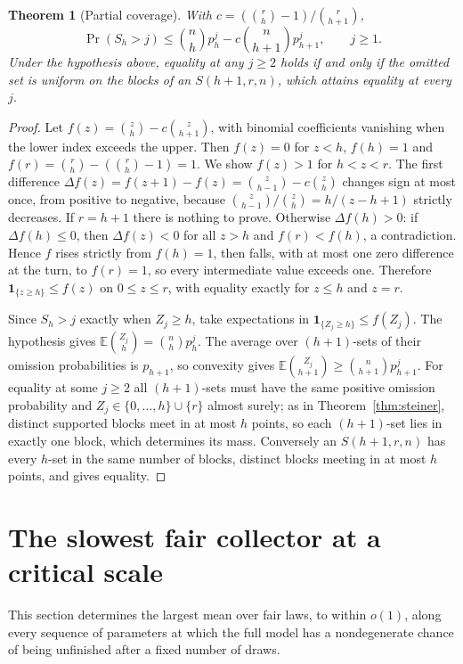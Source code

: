\documentclass[11pt,a4paper]{article}
\newtheorem{theorem}{Theorem}[section]
\theoremstyle{remark}
\newcommand{\E}{\mathbb E}
\newcommand{\ind}{\mathbf 1}
\begin{document}
\begin{theorem}[Partial coverage]\label{thm:higher}
With $c=(\binom rh-1)/\binom r{h+1}$,
\[
 \Pr(S_h>j)\le \binom nh p_h^j-c\binom n{h+1}p_{h+1}^j,\qquad j\ge1 .
\]
Under the hypothesis above, equality at any $j\ge2$ holds if and only if the omitted set is uniform on the blocks of an $S(h+1,r,n)$, which attains equality at every $j$.
\end{theorem}
\begin{proof}
Let $f(z)=\binom zh-c\binom z{h+1}$, with binomial coefficients vanishing when the lower index exceeds the upper. Then $f(z)=0$ for $z<h$, $f(h)=1$ and $f(r)=\binom rh-(\binom rh-1)=1$. We show $f(z)>1$ for $h<z<r$. The first difference $\Delta f(z)=f(z+1)-f(z)=\binom z{h-1}-c\binom zh$ changes sign at most once, from positive to negative, because $\binom z{h-1}/\binom zh=h/(z-h+1)$ strictly decreases. If $r=h+1$ there is nothing to prove. Otherwise $\Delta f(h)>0$: if $\Delta f(h)\le0$, then $\Delta f(z)<0$ for all $z>h$ and $f(r)<f(h)$, a contradiction. Hence $f$ rises strictly from $f(h)=1$, then falls, with at most one zero difference at the turn, to $f(r)=1$, so every intermediate value exceeds one. Therefore $\ind_{\{z\ge h\}}\le f(z)$ on $0\le z\le r$, with equality exactly for $z\le h$ and $z=r$.

Since $S_h>j$ exactly when $Z_j\ge h$, take expectations in $\ind_{\{Z_j\ge h\}}\le f(Z_j)$. The hypothesis gives $\E\binom{Z_j}h=\binom nhp_h^j$. The average over $(h+1)$-sets of their omission probabilities is $p_{h+1}$, so convexity gives $\E\binom{Z_j}{h+1}\ge\binom n{h+1}p_{h+1}^j$. For equality at some $j\ge2$ all $(h+1)$-sets must have the same positive omission probability and $Z_j\in\{0,\dots,h\}\cup\{r\}$ almost surely; as in Theorem~\ref{thm:steiner}, distinct supported blocks meet in at most $h$ points, so each $(h+1)$-set lies in exactly one block, which determines its mass. Conversely an $S(h+1,r,n)$ has every $h$-set in the same number of blocks, distinct blocks meeting in at most $h$ points, and gives equality.
\end{proof}

\section{The slowest fair collector at a critical scale}
\label{sec:critical}
This section determines the largest mean over fair laws, to within $o(1)$, along every sequence of parameters at which the full model has a nondegenerate chance of being unfinished after a fixed number of draws.
\end{document}
